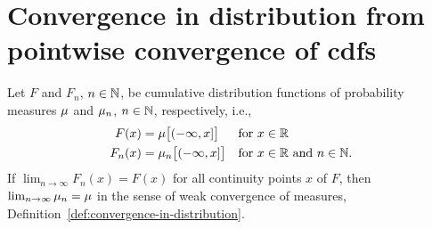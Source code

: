 \section{Convergence in distribution from pointwise convergence of cdfs}

\begin{theorem}
  \label{thm:convergence-in-distribution-with-cdf}
  Let $F$ and $F_n$, $n \in \mathbb{N}$, be cumulative distribution functions of
  probability measures $\mu$ and $\mu_n$, $n \in \mathbb{N}$, respectively, i.e.,
  \begin{align*}
      F(x) = \; & \mu \big[(-\infty,x]\big] & & \text{for $x \in \mathbb{R}$} \\
      F_n(x) = \; & \mu_n \big[(-\infty,x]\big] & & \text{for $x \in \mathbb{R}$ and $n \in \mathbb{N}$.}
  \end{align*}
  If $\lim_{n \to \infty} F_n(x) = F(x)$ for all continuity points $x$ of $F$,
  then $\lim_{n \to \infty} \mu_n = \mu$ in the sense of weak convergence
  of measures, Definition~\ref{def:convergence-in-distribution}.
\end{theorem}
